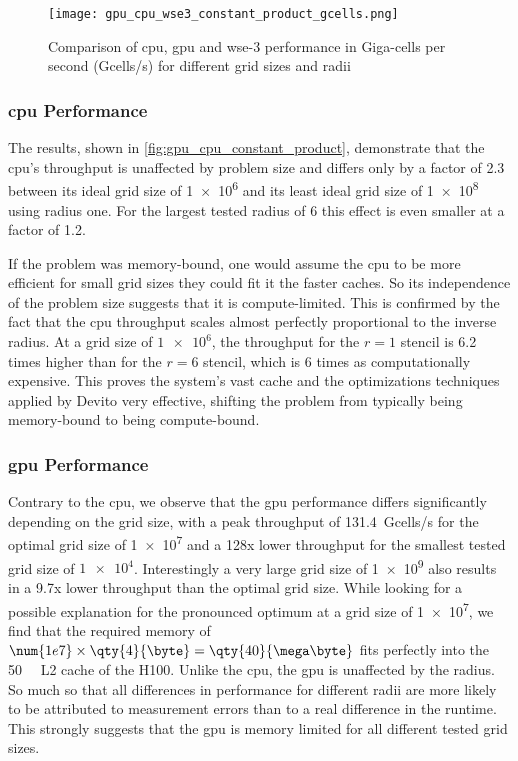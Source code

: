 \begin{figure}[h]
    \centering
    \texttt{[image: gpu\_cpu\_wse3\_constant\_product\_gcells.png]}
    \caption{Comparison of \ac{cpu}, \ac{gpu} and \ac{wse}-3 performance in Giga-cells per second (Gcells/s) for different grid sizes and radii}
    \label{fig:gpu_cpu_constant_product}
\end{figure}

\subsubsection{\ac{cpu} Performance}
The results, shown in \autoref{fig:gpu_cpu_constant_product}, demonstrate that the \ac{cpu}'s throughput is unaffected by problem size and differs only by a factor of \num{2.3} between its ideal grid size of \num{1e6} and its least ideal grid size of \num{1e8} using radius one. For the largest tested radius of \num{6} this effect is even smaller at a factor of \num{1.2}.

If the problem was memory-bound, one would assume the \ac{cpu} to be more efficient for small grid sizes they could fit it the faster caches. So its independence of the problem size suggests that it is compute-limited.
This is confirmed by the fact that the \ac{cpu} throughput scales almost perfectly proportional to the inverse radius.
At a grid size of $\num{1e6}$, the throughput for the $r=1$ stencil is \num{6.2} times higher than for the $r=6$ stencil, which is \num{6} times as computationally expensive. This proves the system's vast cache and the optimizations techniques applied by Devito very effective, shifting the problem from typically being memory-bound to being compute-bound. 

\subsubsection{\ac{gpu} Performance}
Contrary to the \ac{cpu}, we observe that the \ac{gpu} performance differs significantly depending on the grid size, with a peak throughput of \qty{131.4}{Gcells/s} for the optimal grid size of \num{1e7} and a 128x lower throughput for the smallest tested grid size of $\num{1e4}$. Interestingly a very large grid size of \num{1e9} also results in a 9.7x lower throughput than the optimal grid size. While looking for a possible explanation for the pronounced optimum at a grid size of \num{1e7}, we find that the required memory of $\num{1e7}\times\qty{4}{\byte}=\qty{40}{\mega\byte}$ fits perfectly into the \qty{50}{\mega\byte} L2 cache of the H100.
Unlike the \ac{cpu}, the \ac{gpu} is unaffected by the radius. So much so that all differences in performance for different radii are more likely to be attributed to measurement errors than to a real difference in the runtime. This strongly suggests that the \ac{gpu} is memory limited for all different tested grid sizes.

